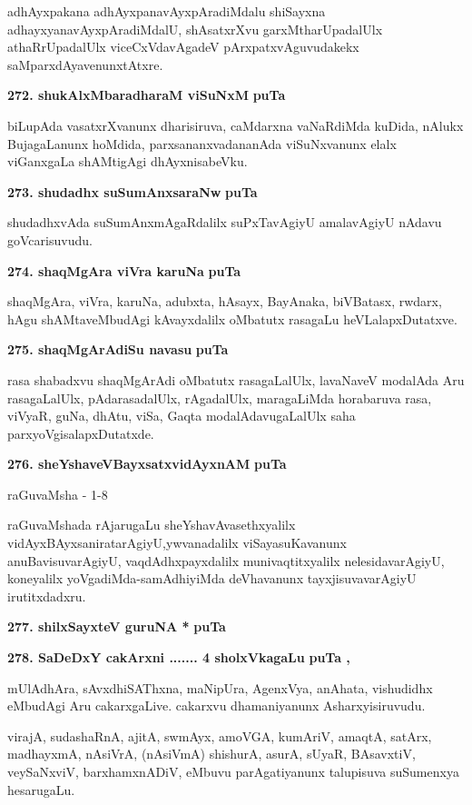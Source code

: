 \smallskip
adhAyxpakana adhAyxpanavAyxpAradiMdalu shiSayxna adhayxyanavAyxpAradiMdalU, shAsatxrXvu garxMtha\-rUpa\-da\-lUlx athaRrUpadalUlx viceCxVdavAgadeV pArxpatxvAguvudakekx saMparxdAyavenunxtAtxre.

\medskip
\noindent
\textbf{272. shukAlxMbaradharaM viSuNxM} \hfill{\bf puTa \pageref{206}}

\smallskip
biLupAda vasatxrXvanunx dharisiruva, caMdarxna vaNaRdiMda kuDida, nAlukx BujagaLanunx hoMdida, parxsananx\-vadananAda viSuNxvanunx elalx viGanxgaLa shAMtigAgi dhAyxnisabeVku.

\medskip
\noindent
\textbf{273. shudadhx suSumAnxsaraNw} \hfill{\bf puTa \pageref{157}}

\smallskip
shudadhxvAda suSumAnxmAgaRdalilx suPxTavAgiyU amalavAgiyU nAdavu goVcarisuvudu.

\medskip
\noindent
\textbf{274. shaqMgAra viVra karuNa} \hfill{\bf puTa \pageref{230}}

\smallskip
shaqMgAra, viVra, karuNa, adubxta, hAsayx, BayAnaka, biVBatasx, rwdarx, hAgu shAMtaveMbudAgi kAvayx\-dalilx oMbatutx rasagaLu heVLalapxDutatxve.

\medskip
\noindent
\textbf{275. shaqMgArAdiSu navasu} \hfill{\bf puTa \pageref{218}}

\smallskip
rasa shabadxvu shaqMgArAdi oMbatutx rasagaLalUlx, lavaNaveV modalAda Aru rasagaLalUlx, pAdarasa\-dalUlx, rAgadalUlx, maragaLiMda horabaruva rasa, viVyaR, guNa, dhAtu, viSa, Gaqta modalAdavu\-gaLalUlx saha\- parxyoVgisalapxDutatxde.

\noindent
\textbf{276. sheYshaveVBayxsatxvidAyxnAM} \hfill{\bf puTa \pageref{28}}

\hfill{raGuvaMsha - 1-8}

raGuvaMshada rAjarugaLu sheYshavAvasethxyalilx vidAyxBAyxsaniratarAgiyU,\break ywvana\-dalilx viSayasuKa\-vanunx anuBavisuvarAgiyU, vaqdAdhxpayxdalilx munivaqtitx\-yalilx nelesidavarAgiyU, koneyalilx yoVga\-diMda-samAdhiyiMda deVhavanunx tayxjisuvavarAgiyU irutitxdadxru.

\medskip
\noindent
\textbf{277. shilxSayxteV guruNA *} \hfill{\bf puTa \pageref{190}}


\medskip
\noindent
\textbf{278. SaDeDxY cakArxni ....... 4 sholxVkagaLu} \hfill{\bf puTa \pageref{154}, \pageref{155}}

\smallskip
mUlAdhAra, sAvxdhiSAThxna, maNipUra, AgenxVya, anAhata, vishudidhx eMbudAgi Aru cakarxgaLive. cakarxvu dhamaniyanunx Asharxyisiruvudu.

\smallskip
virajA, sudashaRnA, ajitA, swmAyx, amoVGA, kumAriV, amaqtA, satArx, madhayxmA, nAsiVrA, (nAsiVmA) shishurA, asurA, sUyaR, BAsavxtiV, veySaNxviV, barxhamxnADiV, eMbuvu parAgatiyanunx talupisuva suSumenxya hesarugaLu.

